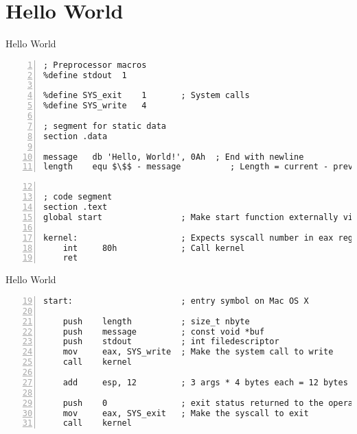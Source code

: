 \section{Hello World}

\begin{frame}[fragile]{Hello World}
\begin{lstlisting}[numbers=left,caption=Datensegment]
; Preprocessor macros
%define stdout  1

%define SYS_exit    1       ; System calls
%define SYS_write   4

; segment for static data
section .data

message   db 'Hello, World!', 0Ah  ; End with newline
length    equ $\$$ - message          ; Length = current - previous address
\end{lstlisting}

\begin{lstlisting}[numbers=left,firstnumber=12,caption=Codesegment - Syscall]

; code segment
section .text
global start                ; Make start function externally visible for linker

kernel:                     ; Expects syscall number in eax register
    int     80h             ; Call kernel
    ret
\end{lstlisting}

\end{frame}

\begin{frame}[fragile]{Hello World}
\begin{lstlisting}[numbers=left,firstnumber=19,caption=Codesegment - Hello World]
start:                      ; entry symbol on Mac OS X

    push    length          ; size_t nbyte
    push    message         ; const void *buf
    push    stdout          ; int filedescriptor
    mov     eax, SYS_write  ; Make the system call to write
    call    kernel
   
    add     esp, 12         ; 3 args * 4 bytes each = 12 bytes

    push    0               ; exit status returned to the operating system
    mov     eax, SYS_exit   ; Make the syscall to exit
    call    kernel
\end{lstlisting}
\end{frame}
